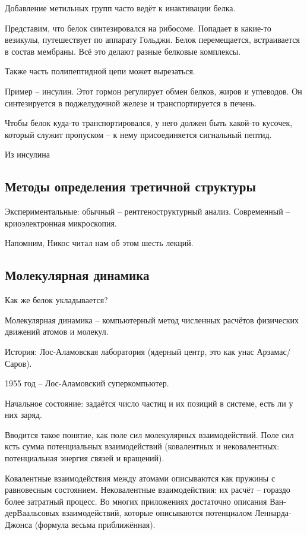 \documentclass[main.tex]{subfiles}
\begin{document}
Добавление метильных групп часто ведёт к инактивации белка.

\begin{leftbar}
	Представим, что белок синтезировался на рибосоме.
	Попадает в какие-то везикулы, путешествует по аппарату Гольджи.
	Белок перемещается, встраивается в состав мембраны.
	Всё это делают разные белковые комплексы.
\end{leftbar}

Также часть полипептидной цепи может вырезаться.

Пример -- инсулин.
Этот гормон регулирует обмен белков, жиров и углеводов.
Он синтезируется в поджелудочной железе и транспортируется в печень.

\begin{leftbar}
	Чтобы белок куда-то транспортировался, у него должен быть какой-то кусочек, который служит пропуском -- к нему присоединяется сигнальный пептид.
\end{leftbar}

Из инсулина 

\subsection{Методы определения третичной структуры}

Экспериментальные: обычный -- рентгеноструктурный анализ.
Современный -- криоэлектронная микроскопия.

Напомним, Никос читал нам об этом шесть лекций.

\subsection{ Молекулярная динамика }

Как же белок укладывается?

Молекулярная динамика -- компьютерный метод численных расчётов физических движений атомов и молекул.

История: Лос-Аламовская лаборатория (ядерный центр, это как унас Арзамас/Саров).

1955 год -- Лос-Аламовский суперкомпьютер.

Начальное состояние: задаётся число частиц и их позиций в системе, есть ли у них заряд.

Вводится такое понятие, как поле сил молекулярных взаимодействий.
Поле сил ксть сумма потенциальных взаимодействий (ковалентных и нековалентных: потенциальная энергия связей и вращений).

Ковалентные взаимодействия между атомами описываются как пружины с равновесным состоянием.
Нековалентные взаимодействия: их расчёт -- гораздо более затратный процесс.
Во многих приложениях достаточно описания Ван-дерВаальсовых взаимодействий, которые описываются потенциалом Леннарда-Джонса (формула весьма приближённая).
\end{document}
